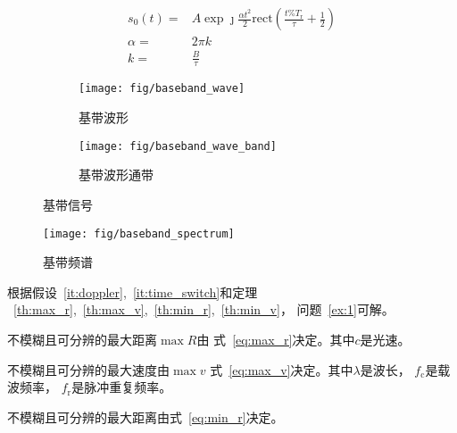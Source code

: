 \documentclass[../main]{subfiles}
\begin{document}
\begin{align}
  \label{eq:baseband_wave}
  s_0(t) = & A\exp{\jmath\frac{\alpha t^2}{2}}
  \mathrm{rect}\left(\frac{t\%T_\mathrm{r}}{\tau} + \frac{1}{2}\right)\\
  \alpha = & 2\pi k\\
  k = & \frac{B}{\tau}
\end{align}

\begin{figure}[htbp]
  \centering
  \begin{subfigure}[htbp]{0.45\linewidth}
    \centering
    \texttt{[image: fig/baseband\_wave]}
    \caption{基带波形}%
    \label{fig:baseband_wave}
  \end{subfigure}
  \quad
  \begin{subfigure}[htbp]{0.45\linewidth}
    \centering
    \texttt{[image: fig/baseband\_wave\_band]}
    \caption{基带波形通带}%
    \label{fig:baseband_wave_band}
  \end{subfigure}
  \caption{基带信号}%
  \label{fig:baseband}
\end{figure}

\begin{figure}[htbp]
  \centering
  \texttt{[image: fig/baseband\_spectrum]}
  \caption{基带频谱}%
  \label{fig:baseband_spectrum}
\end{figure}

根据假设~\ref{it:doppler},~\ref{it:time_switch}和定理%
~\ref{th:max_r},~\ref{th:max_v},~\ref{th:min_r},~\ref{th:min_v}，
问题~\ref{ex:1}可解。

\begin{theorem}[不模糊距离]%
  \label{th:max_r}
  不模糊且可分辨的最大距离$\max{R}$由
  式~\ref{eq:max_r}决定。其中$c$是光速。
\end{theorem}

\begin{theorem}[不模糊速度]%
  \label{th:max_v}
  不模糊且可分辨的最大速度由$\max{v}$
  式~\ref{eq:max_v}决定。其中$\lambda$是波长，
  $f_\mathrm{c}$是载波频率，
  $f_\mathrm{r}$是脉冲重复频率。
\end{theorem}

\begin{theorem}[距离分辨力]%
  \label{th:min_r}
  不模糊且可分辨的最大距离由式~\ref{eq:min_r}决定。
\end{theorem}
\end{document}
